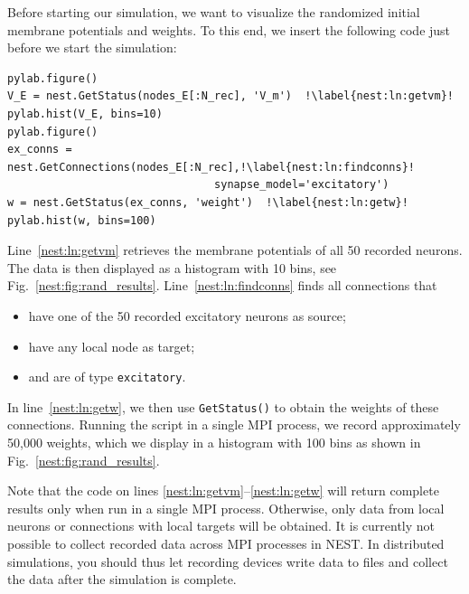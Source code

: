 \documentclass{article}
\begin{document}
Before starting our simulation, we want to visualize the randomized
initial membrane potentials and weights. To this end, we insert the
following code just before we start the simulation:
\begin{lstlisting}[name=brunel-rand]
pylab.figure()
V_E = nest.GetStatus(nodes_E[:N_rec], 'V_m')  !\label{nest:ln:getvm}!
pylab.hist(V_E, bins=10)
pylab.figure()
ex_conns = nest.GetConnections(nodes_E[:N_rec],!\label{nest:ln:findconns}!
                                synapse_model='excitatory')
w = nest.GetStatus(ex_conns, 'weight')  !\label{nest:ln:getw}!
pylab.hist(w, bins=100)
\end{lstlisting}
Line~\ref{nest:ln:getvm} retrieves the membrane potentials of all 50
recorded neurons. The data is then displayed as a histogram with 10
bins, see Fig.~\ref{nest:fig:rand_results}. 
Line~\ref{nest:ln:findconns} finds 
all connections that
\begin{itemize}
\item have one of the 50 recorded excitatory neurons as source;
\item have any local node as target;
\item and are of type \lstinline!excitatory!.
\end{itemize} 
In line~\ref{nest:ln:getw}, we then use \lstinline!GetStatus()! to
obtain the weights of these connections. Running the script in a
single MPI process, we record approximately 50,000 weights, which we
display in a histogram with 100 bins as shown in
Fig.~\ref{nest:fig:rand_results}.

Note that the code on lines \ref{nest:ln:getvm}--\ref{nest:ln:getw}
will return complete results only when run in a single MPI
process. Otherwise, only data from local neurons or connections with
local targets will be obtained. It is currently not possible to
collect recorded data across MPI processes in NEST. In distributed
simulations, you should thus let recording devices write data to files
and collect the data after the simulation is complete.
\end{document}
